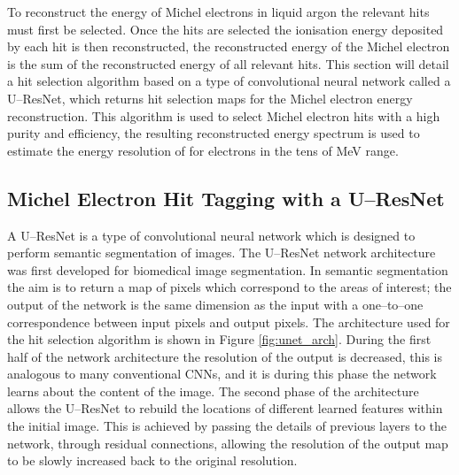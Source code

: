 To reconstruct the energy of Michel electrons in liquid argon the relevant hits
must first be selected. Once the hits are selected the ionisation energy
deposited by each hit is then reconstructed, the reconstructed energy of the
Michel electron is the sum of the reconstructed energy of all relevant hits.
This section will detail a hit selection algorithm based on a type of 
convolutional neural network called a U--ResNet, which returns hit selection 
maps for the Michel electron energy reconstruction. This algorithm is used to 
select Michel electron hits with a high purity and efficiency, the resulting 
reconstructed energy spectrum is used to estimate the energy resolution of 
\protodune{} for electrons in the tens of MeV range.

\subsection{Michel Electron Hit Tagging with a U--ResNet}

A U--ResNet is a type of convolutional neural network which is designed to 
perform semantic segmentation of images. The U--ResNet network architecture 
was first developed for biomedical image segmentation\cite{ronneberger2015u}. 
In semantic segmentation the aim is to return a map of pixels which correspond 
to the areas of interest; the output of the network is the same dimension as 
the input with a one--to--one correspondence between input pixels and output 
pixels. The architecture used for the hit selection algorithm is shown in 
Figure \ref{fig:unet_arch}. During the first half of the network architecture 
the resolution of the output is decreased, this is analogous to many 
conventional CNNs, and it is during this phase the network learns about the 
content of the image. The second phase of the architecture allows the 
U--ResNet to rebuild the locations of different learned features within the 
initial image. This is achieved by passing the details of previous layers to 
the network, through residual connections, allowing the resolution of the 
output map to be slowly increased back to the original resolution.

